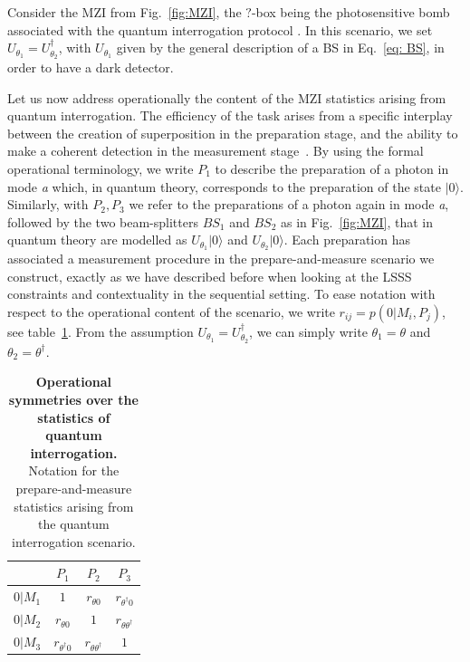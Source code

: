 \documentclass[a4paper,twocolumn,11pt,accepted=2024-01-17]{quantumarticle}
\begin{document}
Consider the MZI from Fig.~\ref{fig:MZI}, the $?$-box being the photosensitive bomb associated with the quantum interrogation protocol \cite{elitzur1993quantum}. In this scenario, we set $U_{\theta_1} = U_{\theta_2}^\dagger$, with $U_{\theta_1}$ given by the general description of a BS in Eq.~\eqref{eq: BS}, in order to have a dark detector.

Let us now address operationally the content of the MZI statistics arising from quantum interrogation. The  efficiency of the task arises from a specific interplay between the creation of superposition in the preparation stage, and the ability to make a coherent detection in the measurement stage~\cite{masini2021coherence}. By using the formal operational terminology, we write $P_1$ to describe the preparation of a photon in mode \textit{a} which, in quantum theory, corresponds to the preparation of the state  $\vert 0 \rangle$. Similarly, with $P_2, P_3$ we refer to the preparations of a photon again in mode \textit{a}, followed by the two beam-splitters $BS_1$ and $BS_2$ as in Fig.~\ref{fig:MZI}, that in quantum theory are modelled as $U_{\theta_1} \vert 0 \rangle$ and $U_{\theta_2}\vert 0 \rangle$. Each preparation has associated a measurement procedure in the prepare-and-measure scenario we construct, exactly as we have described before when looking at the LSSS constraints and contextuality in the sequential setting. To ease notation with respect to the operational content of the scenario, we write $r_{ij} = p(0 \vert M_i, P_j)$, see table~\ref{tab:operational_content_table}. From the assumption $U_{\theta_1} = U_{\theta_2}^\dagger$, we can simply write $\theta_1 = \theta$ and $\theta_2 = \theta^\dagger$.

\begin{table}
    \centering
    \begin{tabular}{|c|c|c|c|}
    \hline
         & $P_1$ & $P_2$ & $P_3$ \\
    \hline
    $0|M_1$  &  $1$  &   $r_{\theta 0}$  &  $r_{\theta^\dagger 0}$   \\
    \hline
    $0|M_2$  &  $r_{\theta 0}$   &  $1$ &   $r_{\theta \theta^\dagger}$  \\
    \hline
    $0|M_3$  &  $r_{\theta^\dagger 0}$   &  $r_{\theta \theta^\dagger}$   &  $1$   \\
    \hline
    \end{tabular}
    \caption{\textbf{Operational symmetries over the statistics of quantum interrogation.} Notation for the prepare-and-measure statistics arising from the quantum interrogation scenario.}
    \label{tab:operational_content_table}
\end{table}
\end{document}
